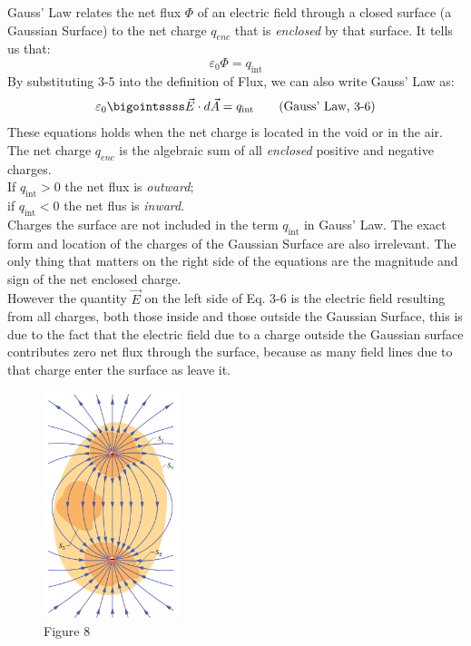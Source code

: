 \documentclass[12pt, a4paper]{article}
\begin{document}
		Gauss' Law relates the net flux $\Phi$ of an electric field through a closed surface (a Gaussian Surface) to the net charge $q_{enc}$ that is \textit{enclosed} by that surface. It tells us that:
		\begin{equation*}
			\varepsilon_0 \Phi = q_{\text{int}}
			\tag{Gauss' Law, 3-5}
		\end{equation*}
		By substituting 3-5 into the definition of Flux, we can also write Gauss' Law as:
		\begin{equation*}
			\varepsilon_0 \bigointssss \vec{E} \cdot d\vec{A} = q_{\text{int}}
			\tag{Gauss' Law, 3-6} 
		\end{equation*}
		These equations holds when the net charge is located in the void or in the air. The net charge $q_{enc}$ is the algebraic sum of all \textit{enclosed} positive and negative charges. \\ 
		If $q_{\text{int}} > 0$ the net flux is \textit{outward}; \\
		if $q_{\text{int}} < 0$ the net flus is \textit{inward}. \\
		Charges  the surface are not included in the term $q_{\text{int}}$ in Gauss' Law. The exact form and location of the charges of the Gaussian Surface are also irrelevant. The only thing that matters on the right side of the equations are the magnitude and sign of the net enclosed charge. \\
		However the quantity $\vec{E}$ on the left side of Eq. 3-6 is the electric field resulting from all charges, both those inside and those outside the Gaussian Surface, this is due to the fact that the electric field due to a charge outside the Gaussian surface contributes zero net flux through the surface, because as many field lines due to that charge enter the surface as leave it. \\
		
		\begin{figure}
			\centering
			\includegraphics[width=4cm]{Physics2_PNGs/gaussian-surf-lines.png}
			\caption*{Figure 8}
			\label{gaussian-surf-lines}
		\end{figure}
		
\end{document}
